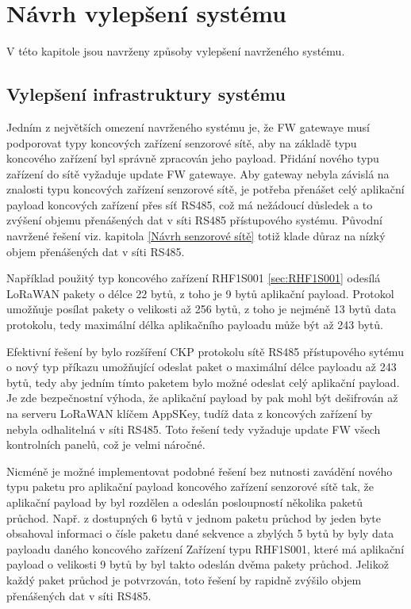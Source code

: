 \chapter{Návrh vylepšení systému}
\label{Návrh vylepšení systému}
V této kapitole jsou navrženy způsoby vylepšení navrženého systému.


\section{Vylepšení infrastruktury systému}
Jedním z největších omezení navrženého systému je, že FW gatewaye musí podporovat typy koncových zařízení senzorové sítě, aby na základě typu koncového zařízení byl správně zpracován jeho payload.
Přidání nového typu zařízení do sítě vyžaduje update FW gatewaye.
Aby gateway nebyla závislá na znalosti typu koncových zařízení senzorové sítě, je potřeba přenášet celý aplikační payload koncových zařízení přes síť RS485, což má nežádoucí důsledek a to zvýšení objemu přenášených dat v síti RS485 přístupového systému.
Původní navržené řešení viz. kapitola \ref{Návrh senzorové sítě} totiž klade důraz na nízký objem přenášených dat v síti RS485.

Například použitý typ koncového zařízení RHF1S001 \ref{sec:RHF1S001} odesílá LoRaWAN pakety o délce 22 bytů, z toho je 9 bytů aplikační payload. Protokol umožňuje posílat pakety o velikosti až 256 bytů, z toho je nejméně 13 bytů data protokolu, tedy maximální délka aplikačního payloadu může být až 243 bytů.

Efektivní řešení by bylo rozšíření CKP protokolu sítě RS485 přístupového sytému o nový typ příkazu umožňující odeslat paket o maximální délce payloadu až 243 bytů, tedy aby jedním tímto paketem bylo možné odeslat celý aplikační payload. 
Je zde bezpečnostní výhoda, že aplikační payload by pak mohl být dešifrován až na serveru LoRaWAN klíčem AppSKey, tudíž data z koncových zařízení by nebyla odhalitelná v síti RS485.
Toto řešení tedy vyžaduje update FW všech kontrolních panelů, což je velmi náročné.

Nicméně je možné implementovat podobné řešení bez nutnosti zavádění nového typu paketu pro aplikační payload koncového zařízení senzorové sítě tak, že aplikační payload by byl rozdělen a odeslán posloupností několika paketů průchod. 
Např. z dostupných 6 bytů v jednom paketu průchod by jeden byte obsahoval informaci o čísle paketu dané sekvence a zbylých 5 bytů by byly data payloadu daného koncového zařízení Zařízení typu RHF1S001, které má aplikační payload o velikosti 9 bytů by byl takto odeslán dvěma pakety průchod. Jelikož každý paket průchod je potvrzován, toto řešení by rapidně zvýšilo objem přenášených dat v síti RS485.



